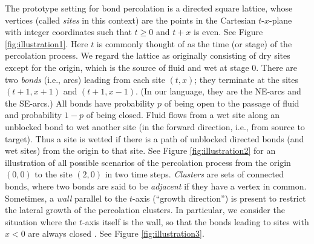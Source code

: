 \documentclass[numbers=enddot,12pt,final,onecolumn,notitlepage]{scrartcl}%
\theoremstyle{definition}
\begin{document}
The prototype setting for bond percolation is a directed square lattice, whose vertices (called \emph{sites} in this context) are the points in the Cartesian $t$-$x$-plane with integer coordinates such that $t \geq 0$ and $t+x$ is even. See Figure \ref{fig:illustration1}.
Here $t$ is commonly thought of as the time (or stage) of the percolation process.
We regard the lattice as originally consisting of dry sites except for the origin, which is the source of fluid and wet at stage $0$.
There are two \emph{bonds} (i.e., arcs) leading from each site $(t, x)$; they terminate at the sites $(t+1, x+1)$ and $(t+1, x-1)$. (In our language, they are the NE-arcs and the SE-arcs.)
All bonds have probability $p$ of being open to the passage of fluid and probability $1-p$ of being closed.
Fluid flows from a wet site along an unblocked bond to wet another site (in the forward direction, i.e., from source to target).
Thus a site is wetted if there is a path of unblocked directed bonds (and wet sites) from the origin to that site.
See Figure \ref{fig:illustration2} for an illustration of all possible scenarios of the percolation process from the origin $(0, 0)$ to the site $(2, 0)$ in two time steps.
\emph{Clusters} are sets of connected bonds, where two bonds are said to be \emph{adjacent} if they have a vertex in common.
Sometimes, a \emph{wall} parallel to the $t$-axis (``growth direction'') is present to restrict the lateral growth of the percolation clusters.
In particular, we consider the situation where the $t$-axis itself is the wall, so that the bonds leading to sites with $x<0$ are always closed \cite{EGJT96}. See Figure \ref{fig:illustration3}.
\end{document}
